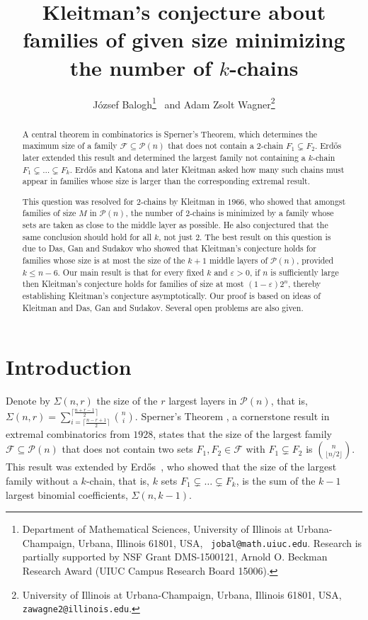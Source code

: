 \documentclass[12pt]{article}
\title{Kleitman's conjecture about families of given size minimizing the number of $k$-chains}
\author{J\'ozsef Balogh\footnote{Department of Mathematical Sciences,
 University of Illinois at Urbana-Champaign, Urbana, Illinois 61801, USA, {\tt
jobal@math.uiuc.edu}. Research is partially supported by NSF Grant DMS-1500121, Arnold O. Beckman Research Award (UIUC Campus Research Board 15006).
}
 ~and Adam Zsolt Wagner\footnote{University of Illinois at Urbana-Champaign, Urbana, Illinois 61801, USA, {\tt
zawagne2@illinois.edu}. }}
\numberwithin{equation}{section}
\def\F{\mathcal{F}}
\def\P{\mathcal{P}}
\def\eps{\varepsilon}
\begin{document}
\maketitle
\begin{abstract}
A central theorem in combinatorics is Sperner's Theorem, which determines the maximum size of a family $\F\subseteq \P(n)$ that does not contain a $2$-chain $F_1\subsetneq F_2$. Erd\H{o}s later extended this result and determined the largest family not containing a $k$-chain $F_1\subsetneq \ldots \subsetneq F_k$. Erd\H{o}s and Katona and later Kleitman asked how many such chains must appear in families whose size is larger than the corresponding extremal result.

This question was resolved for $2$-chains by Kleitman in $1966$, who showed that amongst families of size $M$ in $\P(n)$, the number of $2$-chains is minimized by a family whose sets are taken as close to the middle layer as possible. He also conjectured that the same conclusion should hold for all $k$, not just $2$. The best result on this question is due to Das, Gan and Sudakov who showed that Kleitman's conjecture holds for families whose size is at most the size of the $k+1$ middle layers of $\P(n)$, provided $k\leq n-6$. Our main result is that for every fixed $k$ and $\eps>0$, if $n$ is sufficiently large then Kleitman's conjecture holds for families of size at most $(1-\eps)2^n$, thereby establishing Kleitman's conjecture asymptotically. Our proof is based on ideas of Kleitman and Das, Gan and Sudakov. Several open problems are also given.
\end{abstract}

\section{Introduction}
Denote by $\Sigma(n,r)$ the size of the $r$ largest layers in $\P(n)$, that is, $\Sigma(n,r)=\sum_{i=\lceil \frac{n-r+1}{2}\rceil}^{\lceil \frac{n+r-1}{2}\rceil}\binom{n}{i}$. Sperner's Theorem \cite{sperner}, a cornerstone result in extremal combinatorics from $1928$, states that the size of the largest family $\F\subseteq \P(n)$ that does not contain two sets $F_1,F_2\in\F$ with $F_1\subsetneq F_2$ is $\binom{n}{\lfloor n/2 \rfloor}$. This result was extended by Erd\H{o}s~\cite{erdos}, who showed that the size of the largest family without a $k$-chain, that is, $k$ sets $F_1\subsetneq \ldots \subsetneq F_k$, is the sum of the $k-1$ largest binomial coefficients, $\Sigma(n,k-1)$.
\end{document}

